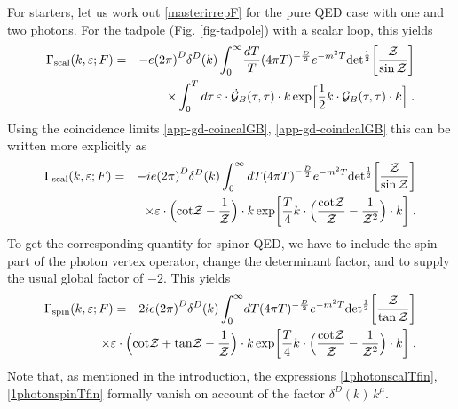 \documentclass[a4paper,11pt]{article}
\begin{document}
For starters, let us work out \eqref{masterirrepF} for the pure QED case with one and two photons. 
For the tadpole (Fig. \ref{fig-tadpole}) with a scalar loop, this yields
%
\begin{eqnarray}
\Gamma_{\rm scal}
(k,\varepsilon;F)
&=&
-e
{(2\pi )}^D\delta^D (k)
\int_{0}^{\infty}}{dT\over T}
{(4\pi T)^{-{D\over 2}}
e^{-m^2T}
{\rm det}^{{1\over 2}} \biggl[\frac{\cZ}{\sin\cZ}\biggr]
\nonumber\\ 
&& \times
\int_0^T  d\tau \,
\varepsilon\cdot\dot{\cal G}_{B}(\tau,\tau)\cdot k
\,{\rm exp}\Bigl[\half k\cdot {\cal G}_{B}(\tau,\tau)\cdot  k\Bigr] \;.
\label{1photonscalT}
\end{eqnarray}
Using the coincidence limits \eqref{app-gd-coincalGB}, \eqref{app-gd-coindcalGB} this can be written more
explicitly as
%
\begin{eqnarray}
\Gamma_{\rm scal}
(k,\varepsilon;F)
&=&
-ie
{(2\pi )}^D\delta^D (k)
\int_{0}^{\infty}dT
{(4\pi T)}^{-{D\over 2}}
e^{-m^2T}
{\rm det}^{\frac{1}{2}} \biggl[ \frac{{\cal Z}}{\sin {\cal Z}}\biggr]
\nonumber\\ 
&& \times
\varepsilon\cdot
\Bigl({\cot}{{\cal Z}} - \frac{1}{{\cal Z}}\Bigr)
\cdot k
\,{\rm exp}\biggl[\frac{T}{4} 
k\cdot 
\Bigl(\frac{{\cot}{\cal Z}}{{\cal Z}} - \frac{1}{{{\cal Z}}^2}\Bigr)
\cdot  k\biggr] \;.
\label{1photonscalTfin}
\end{eqnarray}
To get the corresponding quantity for spinor QED, we have to include the spin part of the photon vertex operator,
change the determinant factor, and to supply the usual
global factor of $-2$. This yields 
%
\begin{eqnarray}
\Gamma_{\rm spin}
(k,\varepsilon;F)
&=&
2ie
{(2\pi )}^D\delta^D (k)
\int_{0}^{\infty}}dT
{(4\pi T)^{-{D\over 2}}
e^{-m^2T}
{\rm det}^{{1\over 2}} \biggl[\frac{\cZ}{\tan\cZ}\biggr]
\nonumber\\ 
&& \hskip -1.5cm
\times
\varepsilon\cdot
\Bigl({\cot}{\cZ} + {\tan}{\cZ}  - \frac{1}{\cZ}\Bigr)
\cdot k
\,{\rm exp}\biggl[\frac{T}{4} 
k\cdot 
\Bigl(\frac{{\cot}\cZ}{\cZ}- \frac{1}{{\cZ}^2}\Bigr)
\cdot  k\biggr] \;.
\label{1photonspinTfin}
\end{eqnarray}
Note that, as mentioned in the introduction, the expressions \eqref{1photonscalTfin}, \eqref{1photonspinTfin} formally vanish
on account of the factor $\delta^D(k)\, k^{\mu}$. 
\end{document}
